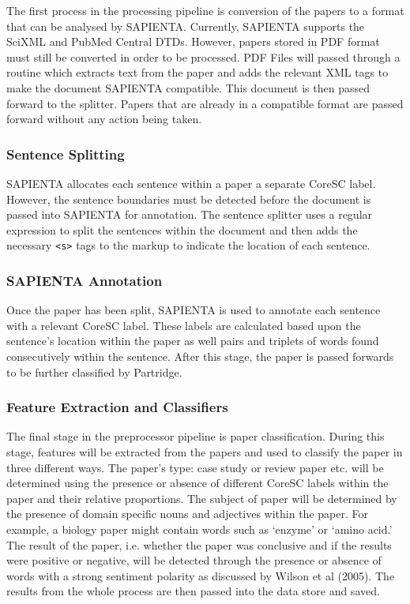 The first process in the processing pipeline is conversion of the papers to a
format that can be analysed by SAPIENTA. Currently, SAPIENTA supports the
SciXML\cite{rupp2006flexible} and PubMed Central\cite{pubmedDTD} DTDs. However,
papers stored in PDF format must still be converted in order to be processed.
PDF Files will passed through a routine which extracts text from the paper and
adds the relevant XML tags to make the document SAPIENTA compatible. This
document is then passed forward to the splitter. Papers that are already in a
compatible format are passed forward without any action being taken.

\subsubsection{Sentence Splitting} 

SAPIENTA allocates each sentence within a paper a separate CoreSC label.
However, the sentence boundaries must be detected before the document is passed
into SAPIENTA for annotation. The sentence splitter uses a regular expression
to split the sentences within the document and then adds the necessary
\verb|<s>| tags to the markup to indicate the location of each sentence.

\subsubsection{SAPIENTA Annotation}

Once the paper has been split, SAPIENTA is used to annotate each sentence with
a relevant CoreSC label. These labels are calculated based upon the
sentence's location within the paper as well pairs and triplets of words found
consecutively within the sentence. After this stage, the paper is passed
forwards to be further classified by Partridge.

\subsubsection{Feature Extraction and Classifiers}

The final stage in the preprocessor pipeline is paper classification. During
this stage, features will be extracted from the papers and used to classify the
paper in three different ways. The paper's type: case study or review paper
etc. will be determined using the presence or absence of different CoreSC labels
within the paper and their relative proportions. The subject of paper will be
determined by the presence of domain specific nouns and adjectives within the
paper. For example, a biology paper might contain words such as `enzyme' or `amino
acid.' The result of the paper, i.e. whether the paper was conclusive and if the
results were positive or negative, will be detected through the presence or absence
of words with a strong sentiment polarity as discussed by Wilson et al
(2005)\cite{Wilson05Polarity}. The results from the whole process are then
passed into the data store and saved.


